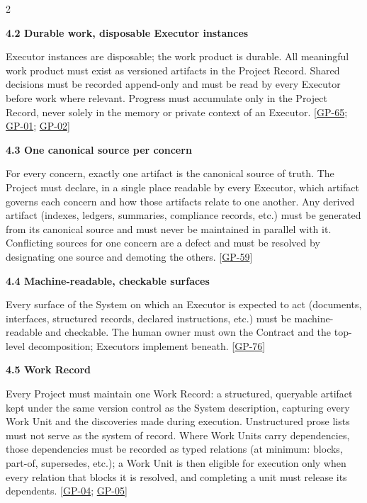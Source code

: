 \begin{multicols}{2}
\par\smallskip\noindent\textbf{4.2 Durable work, disposable Executor instances}\par\nopagebreak

Executor instances are disposable; the work product is durable. All meaningful work product must exist as versioned artifacts in the Project Record. Shared decisions must be recorded append-only and must be read by every Executor before work where relevant. Progress must accumulate only in the Project Record, never solely in the memory or private context of an Executor. [\hyperlink{gp-65}{GP-65}; \hyperlink{gp-01}{GP-01}; \hyperlink{gp-02}{GP-02}]

\hypertarget{nss-4.3}{}

\par\smallskip\noindent\textbf{4.3 One canonical source per concern}\par\nopagebreak

For every concern, exactly one artifact is the canonical source of truth. The Project must declare, in a single place readable by every Executor, which artifact governs each concern and how those artifacts relate to one another. Any derived artifact (indexes, ledgers, summaries, compliance records, etc.) must be generated from its canonical source and must never be maintained in parallel with it. Conflicting sources for one concern are a defect and must be resolved by designating one source and demoting the others. [\hyperlink{gp-59}{GP-59}]

\hypertarget{nss-4.4}{}

\par\smallskip\noindent\textbf{4.4 Machine-readable, checkable surfaces}\par\nopagebreak

Every surface of the System on which an Executor is expected to act (documents, interfaces, structured records, declared instructions, etc.) must be machine-readable and checkable. The human owner must own the Contract and the top-level decomposition; Executors implement beneath. [\hyperlink{gp-76}{GP-76}]

\hypertarget{nss-4.5}{}

\par\smallskip\noindent\textbf{4.5 Work Record}\par\nopagebreak

Every Project must maintain one Work Record: a structured, queryable artifact kept under the same version control as the System description, capturing every Work Unit and the discoveries made during execution. Unstructured prose lists must not serve as the system of record. Where Work Units carry dependencies, those dependencies must be recorded as typed relations (at minimum: blocks, part-of, supersedes, etc.); a Work Unit is then eligible for execution only when every relation that blocks it is resolved, and completing a unit must release its dependents. [\hyperlink{gp-04}{GP-04}; \hyperlink{gp-05}{GP-05}]


\end{multicols}
